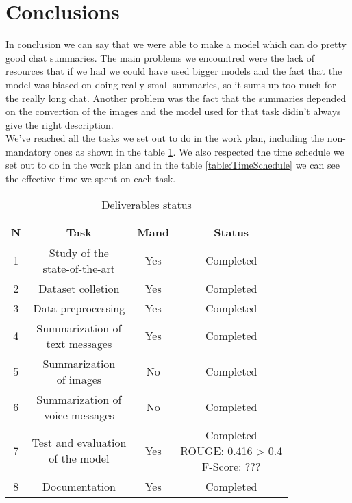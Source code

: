 \documentclass[10pt,twocolumn,letterpaper]{article}
\begin{document}
\section{Conclusions}
In conclusion we can say that we were able to make a model which can do pretty good chat summaries.
The main problems we encountred were the lack of resources that if we had we could have used bigger models and 
the fact that the model was biased on doing really small summaries, 
so it sums up too much for the really long chat. 
Another problem was the fact that the summaries depended on the convertion of the images and the model used for 
that task didin't always give the right description. \\
We've reached all the tasks we set out to do in the work plan, including the non-mandatory ones as shown
in the table \ref{table:Deliverables}. We also respected the time schedule we set out to do in the work plan and in the 
table \ref{table:TimeSchedule} we can see the effective time we spent on each task.
\begin{table}[h!]
    \centering
    \begin{tabular}{|c|c|c|c|}
        \hline
        \rowcolor{lightergray}
        N & Task & Mand & Status\\ 
        \hline
        1 & \makecell{Study of the \\ state-of-the-art } & Yes & Completed \\
        \hline
        2 & Dataset colletion & Yes & Completed \\
        \hline
        3 & Data preprocessing & Yes & Completed \\
        \hline
        4 & \makecell{Summarization of \\ text messages} & Yes & Completed \\
        \hline
        5 & \makecell{Summarization \\ of images} & No & Completed \\
        \hline
        6 & \makecell{Summarization of \\ voice messages} & No & Completed \\
        \hline
        7 & \makecell{Test and evaluation \\ of the model} & Yes & \makecell{Completed \\ ROUGE: 0.416 > 0.4 \\ F-Score: ???} \\
        \hline
        8 & Documentation & Yes & Completed \\
        \hline
    \end{tabular}
    \caption{Deliverables status}
    \label{table:Deliverables}
\end{table}
\end{document}
